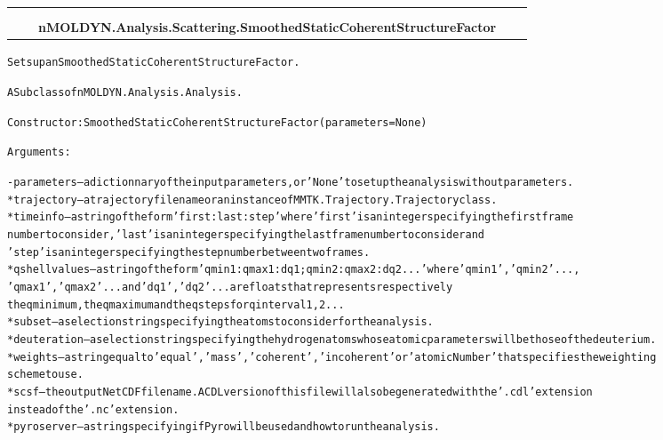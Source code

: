     \label{nMOLDYN:Analysis:Scattering:SmoothedStaticCoherentStructureFactor}
\begin{tabular}{cccccc}
\multicolumn{2}{r}{\settowidth{\BCL}{nMOLDYN.Analysis.Analysis.Analysis}\multirow{2}{\BCL}{nMOLDYN.Analysis.Analysis.Analysis}}
&&
  \\\cline{3-3}
  &&\multicolumn{1}{c|}{}
&&
  \\
&&\multicolumn{2}{l}{\textbf{nMOLDYN.Analysis.Scattering.SmoothedStaticCoherentStructureFactor}}
\end{tabular}

\begin{alltt}
Sets up an Smoothed Static Coherent Structure Factor.

A Subclass of nMOLDYN.Analysis.Analysis. 

Constructor: SmoothedStaticCoherentStructureFactor({\textbar}parameters{\textbar} = None)

Arguments:

    - {\textbar}parameters{\textbar} -- a dictionnary of the input parameters, or 'None' to set up the analysis without parameters.
        * trajectory        -- a trajectory file name or an instance of MMTK.Trajectory.Trajectory class.
        * timeinfo          -- a string of the form 'first:last:step' where 'first' is an integer specifying the first frame 
                               number to consider, 'last' is an integer specifying the last frame number to consider and 
                               'step' is an integer specifying the step number between two frames.
        * qshellvalues      -- a string of the form 'qmin1:qmax1:dq1;qmin2:qmax2:dq2...' where 'qmin1', 'qmin2' ... , 
                               'qmax1', 'qmax2' ... and 'dq1', 'dq2' ... are floats that represents respectively 
                               the q minimum, the q maximum and the q steps for q interval 1, 2 ...
        * subset            -- a selection string specifying the atoms to consider for the analysis.
        * deuteration       -- a selection string specifying the hydrogen atoms whose atomic parameters will be those of the deuterium.
        * weights           -- a string equal to 'equal', 'mass', 'coherent' , 'incoherent' or 'atomicNumber' that specifies the weighting
                               scheme to use.
        * scsf              -- the output NetCDF file name. A CDL version of this file will also be generated with the '.cdl' extension
                               instead of the '.nc' extension.
        * pyroserver        -- a string specifying if Pyro will be used and how to run the analysis.
    

\end{alltt}
